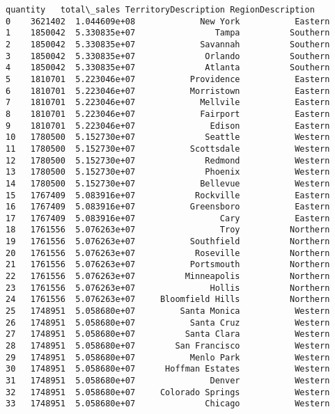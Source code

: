 \documentclass[11pt]{article}
\makeatletter
\newcommand{\boxspacing}{\kern\kvtcb@left@rule\kern\kvtcb@boxsep}
\newcommand{\prompt}[4]{
        {\ttfamily\llap{{\color{#2}[#3]:\hspace{3pt}#4}}\vspace{-\baselineskip}}
    }
\makeatother
\begin{document}
            \begin{tcolorbox}[breakable, size=fbox, boxrule=.5pt, pad at break*=1mm, opacityfill=0]
\prompt{Out}{outcolor}{28}{\boxspacing}
\begin{Verbatim}[commandchars=\\\{\}]
    quantity   total\_sales TerritoryDescription RegionDescription
0    3621402  1.044609e+08             New York           Eastern
1    1850042  5.330835e+07                Tampa          Southern
2    1850042  5.330835e+07             Savannah          Southern
3    1850042  5.330835e+07              Orlando          Southern
4    1850042  5.330835e+07              Atlanta          Southern
5    1810701  5.223046e+07           Providence           Eastern
6    1810701  5.223046e+07           Morristown           Eastern
7    1810701  5.223046e+07             Mellvile           Eastern
8    1810701  5.223046e+07             Fairport           Eastern
9    1810701  5.223046e+07               Edison           Eastern
10   1780500  5.152730e+07              Seattle           Western
11   1780500  5.152730e+07           Scottsdale           Western
12   1780500  5.152730e+07              Redmond           Western
13   1780500  5.152730e+07              Phoenix           Western
14   1780500  5.152730e+07             Bellevue           Western
15   1767409  5.083916e+07            Rockville           Eastern
16   1767409  5.083916e+07           Greensboro           Eastern
17   1767409  5.083916e+07                 Cary           Eastern
18   1761556  5.076263e+07                 Troy          Northern
19   1761556  5.076263e+07           Southfield          Northern
20   1761556  5.076263e+07            Roseville          Northern
21   1761556  5.076263e+07           Portsmouth          Northern
22   1761556  5.076263e+07          Minneapolis          Northern
23   1761556  5.076263e+07               Hollis          Northern
24   1761556  5.076263e+07     Bloomfield Hills          Northern
25   1748951  5.058680e+07         Santa Monica           Western
26   1748951  5.058680e+07           Santa Cruz           Western
27   1748951  5.058680e+07          Santa Clara           Western
28   1748951  5.058680e+07        San Francisco           Western
29   1748951  5.058680e+07           Menlo Park           Western
30   1748951  5.058680e+07      Hoffman Estates           Western
31   1748951  5.058680e+07               Denver           Western
32   1748951  5.058680e+07     Colorado Springs           Western
33   1748951  5.058680e+07              Chicago           Western

\end{Verbatim}
\end{tcolorbox}
\end{document}
